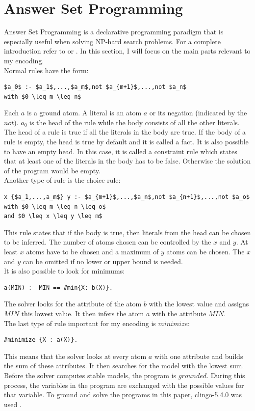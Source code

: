 \documentclass[runningheads]{llncs}
\begin{document}
\section{Answer Set Programming}
Answer Set Programming is a declarative programming paradigm that is especially useful when solving NP-hard search problems. For a complete introduction refer to \cite{asp} or \cite{asp2}. In this section, I will focus on the main parts relevant to my encoding. \\
Normal rules have the form:
\begin{lstlisting}
$a_0$ :- $a_1$,...,$a_m$,not $a_{m+1}$,...,not $a_n$         
with $0 \leq m \leq n$
\end{lstlisting}
Each $a$ is a ground atom. A literal is an atom $a$ or its negation (indicated by the  $not$). $a_0$ is the head of the rule while the body consists of all the other literals. The head of a rule is true if all the literals in the body are true. If the body of a rule is empty, the head is true by default and it is called a fact. It is also possible to have an empty head. In this case, it is called a constraint rule which states that at least one of the literals in the body has to be false. Otherwise the solution of the program would be empty. \\
Another type of rule is the choice rule:
\begin{lstlisting}
x {$a_1,...,a_m$} y :- $a_{m+1}$,...,$a_n$,not $a_{n+1}$,...,not $a_o$ 
with $0 \leq m \leq n \leq o$
and $0 \leq x \leq y \leq m$
\end{lstlisting}
This rule states that if the body is true, then literals from the head can be chosen to be inferred. The number of atoms chosen can be controlled by the $x$ and $y$. At least $x$ atoms have to be chosen and a maximum of $y$ atoms can be chosen. The $x$ and $y$ can be omitted if no lower or upper bound is needed.\\
It is also possible to look for minimums:
\begin{verbatim}
a(MIN) :- MIN == #min{X: b(X)}.
\end{verbatim}
The solver looks for the attribute of the atom $b$ with the lowest value and assigns  $MIN$ this lowest value. It then infers the atom $a$ with the attribute $MIN$. \\
The last type of rule important for my encoding is $minimize$:
\begin{verbatim}
#minimize {X : a(X)}.
\end{verbatim}
This means that the solver looks at every atom $a$ with one attribute and builds the sum of these attributes. It then searches for the model with the lowest sum. \\
Before the solver computes stable models, the program is $grounded$. During this process, the variables in the program are exchanged with the possible values for that variable.
To ground and solve the programs in this paper, clingo-5.4.0 was used \cite{clingo}.  \\
\end{document}

